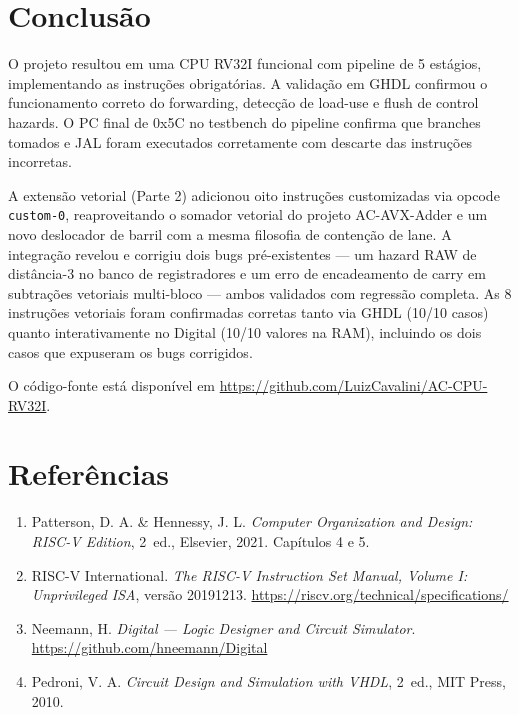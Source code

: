 \documentclass[12pt, a4paper]{article}
\newcommand{\code}[1]{\texttt{#1}}
\begin{document}
\section{Conclusão}

O projeto resultou em uma CPU RV32I funcional com pipeline de 5 estágios,
implementando as instruções obrigatórias. A validação em GHDL confirmou
o funcionamento correto do forwarding, detecção de load-use e flush de
control hazards. O PC final de 0x5C no testbench do pipeline confirma que
branches tomados e JAL foram executados corretamente com descarte das
instruções incorretas.

A extensão vetorial (Parte 2) adicionou oito instruções customizadas
via opcode \code{custom-0}, reaproveitando o somador vetorial do
projeto AC-AVX-Adder e um novo deslocador de barril com a mesma
filosofia de contenção de lane. A integração revelou e corrigiu dois
bugs pré-existentes --- um hazard RAW de distância-3 no banco de
registradores e um erro de encadeamento de carry em subtrações
vetoriais multi-bloco --- ambos validados com regressão completa. As 8
instruções vetoriais foram confirmadas corretas tanto via GHDL (10/10
casos) quanto interativamente no Digital (10/10 valores na RAM),
incluindo os dois casos que expuseram os bugs corrigidos.

O código-fonte está disponível em
\url{https://github.com/LuizCavalini/AC-CPU-RV32I}.

\newpage
\section{Referências}

\begin{enumerate}[leftmargin=2em]
  \item Patterson, D. A. \& Hennessy, J. L. \textit{Computer Organization and
    Design: RISC-V Edition}, 2\textordfeminine~ed., Elsevier, 2021. Capítulos 4 e 5.

  \item RISC-V International. \textit{The RISC-V Instruction Set Manual,
    Volume I: Unprivileged ISA}, versão 20191213.
    \url{https://riscv.org/technical/specifications/}

  \item Neemann, H. \textit{Digital --- Logic Designer and Circuit Simulator}.
    \url{https://github.com/hneemann/Digital}

  \item Pedroni, V. A. \textit{Circuit Design and Simulation with VHDL},
    2\textordfeminine~ed., MIT Press, 2010.
\end{enumerate}
\end{document}
